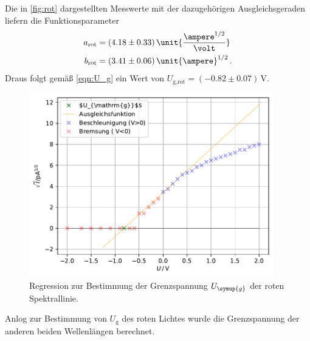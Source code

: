 Die in \autoref{fig:rot} dargestellten Messwerte mit der dazugehörigen Ausgleichsgeraden liefern die Funktionsparameter 
\begin{align*}
    a_{\text{rot}}&=(4.18\pm 0.33) \, \unit{\frac{\ampere ^{1/2}}{\volt}}\\
    b_{\text{rot}}&=(3.41\pm 0.06) \, \unit{\ampere}^{1/2}\, .\\
\end{align*}
Draus folgt gemäß \autoref{eqn:U_g} ein Wert von $U_{\text{g,rot}}=(-0.82\pm 0.07)\, \unit{\volt}$.
\begin{figure}
    \centering
    \includegraphics[height = 8cm]{build/plotrot.pdf}
    \caption{Regression zur Bestimmung der Grenzspannung $U_{\symup{g}}$ der roten Spektrallinie.}
    \label{fig:rot}
\end{figure}
Anlog zur Bestimmung von $U_{\text{g}}$ des roten Lichtes wurde die Grenzspannung der anderen beiden Wellenlängen 
berechnet.

